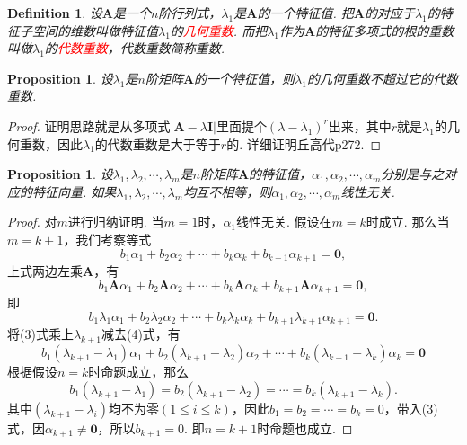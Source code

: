 \documentclass{article}
\newtheorem{proposition}[theorem]{Proposition}
\newtheorem{definition}[theorem]{Definition}
\newcommand{\mbf}[1]{\bm{#1}}
\newcommand{\redt}[1]{\textcolor{red}{#1}}
\begin{document}
\begin{definition}
\rm 设$\mbf{A}$是一个$n$阶行列式，$\lambda_1$是$\mbf{A}$的一个特征值. 把$\mbf{A}$的对应于$\lambda_1$的特征子空间的维数叫做特征值$\lambda_1$的\redt{几何重数}. 而把$\lambda_1$作为$\mbf{A}$的特征多项式的根的重数叫做$\lambda_1$的\redt{代数重数}，代数重数简称重数.
\end{definition}

\begin{proposition}
\rm 设$\lambda_1$是$n$阶矩阵$\mbf{A}$的一个特征值，则$\lambda_
1$的几何重数不超过它的代数重数.
\end{proposition}

\begin{proof}
证明思路就是从多项式$|\mbf{A}-\lambda\mbf{I}|$里面提个$(\lambda-\lambda_1)^r$出来，其中$r$就是$\lambda_1$的几何重数，因此$\lambda_1$的代数重数是大于等于$r$的. 详细证明丘高代p272.
\end{proof}

\begin{proposition}\label{characteristic: subspace-prop1}
\rm 设$\lambda_1,\lambda_2,\cdots,\lambda_m$是$n$阶矩阵$\mbf{A}$的特征值，$\alpha_1,\alpha_2,\cdots,\alpha_m$分别是与之对应的特征向量. 如果$\lambda_1,\lambda_2,\cdots,\lambda_m$均互不相等，则$\alpha_1,\alpha_2,\cdots,\alpha_m$线性无关.
\end{proposition}

\begin{proof}
对$m$进行归纳证明. 当$m=1$时，$\alpha_1$线性无关. 假设在$m=k$时成立. 那么当$m=k+1$，我们考察等式
\begin{equation}
b_1\alpha_1+b_2\alpha_2+\cdots+b_k\alpha_{k}+b_{k+1}\alpha_{k+1} = \mbf{0},
\end{equation}
上式两边左乘$\mbf{A}$，有
$$
b_1\mbf{A}\alpha_1+b_2\mbf{A}\alpha_2+\cdots+b_k\mbf{A}\alpha_{k}+b_{k+1}\mbf{A}\alpha_{k+1} = \mbf{0}, 
$$
即
\begin{equation}
b_1\lambda_1\alpha_1+b_2\lambda_2\alpha_2+\cdots+b_k\lambda_k\alpha_{k}+b_{k+1}\lambda_{k+1}\alpha_{k+1} = \mbf{0}.
\end{equation}
将(3)式乘上$\lambda_{k+1}$减去(4)式，有
$$
b_1(\lambda_{k+1}-\lambda_1)\alpha_1+b_2(\lambda_{k+1}-\lambda_2)\alpha_2+\cdots+b_k(\lambda_{k+1}-\lambda_k)\alpha_{k} = \mbf{0}
$$
根据假设$n=k$时命题成立，那么
$$
b_1(\lambda_{k+1}-\lambda_1) = b_2(\lambda_{k+1}-\lambda_2) =\cdots = b_k(\lambda_{k+1}-\lambda_k).
$$
其中$(\lambda_{k+1} - \lambda_i)$均不为零$(1\leq i \leq k)$，因此$b_1 = b_2 = \cdots = b_k = 0$，带入(3)式，因$\alpha_{k+1} \neq \mbf{0}$，所以$b_{k+1}=0$. 即$n = k+1$时命题也成立.  
\end{proof}
\end{document}
